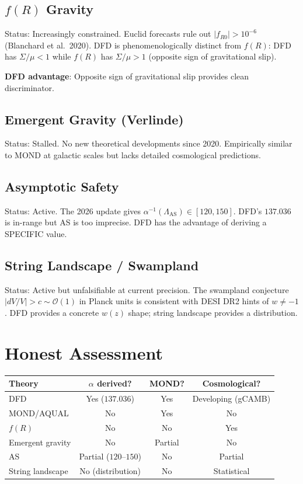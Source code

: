 \documentclass[11pt,a4paper]{article}
\begin{document}
\subsection{$f(R)$ Gravity}

Status: Increasingly constrained. Euclid forecasts rule out $|f_{R0}| > 10^{-6}$ (Blanchard et al.\ 2020). DFD is phenomenologically distinct from $f(R)$: DFD has $\Sigma/\mu < 1$ while $f(R)$ has $\Sigma/\mu > 1$ (opposite sign of gravitational slip).

\textbf{DFD advantage}: Opposite sign of gravitational slip provides clean discriminator.

\subsection{Emergent Gravity (Verlinde)}

Status: Stalled. No new theoretical developments since 2020. Empirically similar to MOND at galactic scales but lacks detailed cosmological predictions.

\subsection{Asymptotic Safety}

Status: Active. The 2026 update gives $\alpha^{-1}(\Lambda_{\mathrm{AS}}) \in [120, 150]$. DFD's $137.036$ is in-range but AS is too imprecise. DFD has the advantage of deriving a SPECIFIC value.

\subsection{String Landscape / Swampland}

Status: Active but unfalsifiable at current precision. The swampland conjecture $|dV/V| > c \sim \mathcal{O}(1)$ in Planck units is consistent with DESI DR2 hints of $w \neq -1$. DFD provides a concrete $w(z)$ shape; string landscape provides a distribution.

\section{Honest Assessment}

\begin{center}
\begin{tabular}{lccc}
\toprule
\textbf{Theory} & \textbf{$\alpha$ derived?} & \textbf{MOND?} & \textbf{Cosmological?} \\
\midrule
DFD & Yes ($137.036$) & Yes & Developing (gCAMB) \\
MOND/AQUAL & No & Yes & No \\
$f(R)$ & No & No & Yes \\
Emergent gravity & No & Partial & No \\
AS & Partial ($120$--$150$) & No & Partial \\
String landscape & No (distribution) & No & Statistical \\
\bottomrule
\end{tabular}
\end{center}
\end{document}
